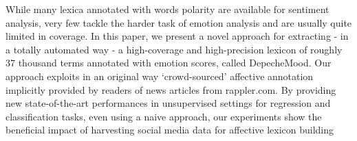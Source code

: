 While many lexica annotated with words polarity are available for sentiment analysis, very few tackle the harder task of emotion analysis and are usually quite limited in coverage. In this paper, we present a novel approach for extracting - in a totally automated way - a high-coverage and high-precision lexicon of roughly 37 thousand terms annotated with emotion scores, called DepecheMood. Our approach exploits in an original way `crowd-sourced' affective annotation implicitly provided by readers of news articles from rappler.com. By providing new state-of-the-art performances in unsupervised settings for regression and classification tasks, even using a naive approach, our experiments show the beneficial impact of harvesting social media data for affective lexicon building
